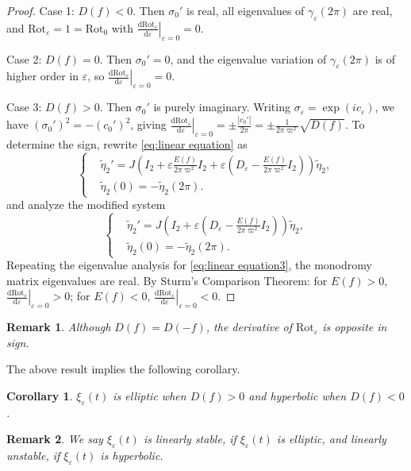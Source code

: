 \documentclass[11pt]{amsart}
\newcommand{\ep}{\varepsilon}
\newcommand{\om}{\varpi}
\newtheorem{remark}{Remark}[section]
\newtheorem{coro}{Corollary}[section]
\begin{document}
\begin{proof}
	Case 1: $D(f)<0$. Then $\sigma_{0}'$ is real, all eigenvalues of $\gamma_{\ep}(2\pi)$ are real, and $\text{Rot}_{\ep}=1=\text{Rot}_{0}$  with $\left.\frac{\mathrm{d}\text{Rot}_{\ep}}{\mathrm{d}\ep}\right|_{\ep=0}=0$.
	
	Case 2: $D(f)=0$. Then $\sigma_{0}'=0$, and the eigenvalue variation of $\gamma_{\ep}(2\pi)$ is of higher order in $\ep$, so $\left.\frac{\mathrm{d}\text{Rot}_{\ep}}{\mathrm{d}\ep}\right|_{\ep=0}=0$.
	
	Case 3: $D(f)>0$. Then $\sigma_{0}'$ is purely imaginary. Writing $\sigma_{\ep}=\exp(ic_{\ep})$, we have $(\sigma_{0}')^{2}=-(c_{0}')^{2}$, giving $\left.\frac{\mathrm{d}\text{Rot}_{\ep}}{\mathrm{d}\ep}\right|_{\ep=0}=\pm\frac{|c_{0}'|}{2\pi}=\pm\frac{1}{2\pi\om^{2}}\sqrt{D(f)}$. To determine the sign, rewrite \eqref{eq:linear equation} as 
	\begin{equation}\label{eq:linear equation2}
		\left\{\begin{aligned}
			&\tilde{\eta}_2'=J\left(I_2+\ep\frac{E(f)}{2\pi\om^{2}}I_2+\ep \left(D_{\ep}-\frac{E(f)}{2\pi\om^{2}}I_2\right)\right)\tilde{\eta}_2,\\
			&\tilde{\eta}_2(0)=-\tilde{\eta}_2(2\pi).
		\end{aligned}\right.
	\end{equation}
	and analyze the modified system 
	\begin{equation}\label{eq:linear equation3}
		\left\{\begin{aligned}
			&\tilde{\eta}_2'=J\left(I_2+\ep \left(D_{\ep}-\frac{E(f)}{2\pi\om^{2}}I_2\right)\right)\tilde{\eta}_2,\\
			&\tilde{\eta}_2(0)=-\tilde{\eta}_2(2\pi).
		\end{aligned}\right.
	\end{equation}
	Repeating the eigenvalue analysis for \eqref{eq:linear equation3}, the monodromy matrix eigenvalues are real. By Sturm’s Comparison Theorem: for $E(f)>0$, $\left.\frac{\mathrm{d}\text{Rot}_{\ep}}{\mathrm{d}\ep}\right|_{\ep=0}>0$; for $E(f)<0$, $\left.\frac{\mathrm{d}\text{Rot}_{\ep}}{\mathrm{d}\ep}\right|_{\ep=0}<0$.
\end{proof}
\begin{remark}
	Although $D(f)=D(-f)$, the derivative of $\text{Rot}_\ep$ is opposite in sign.
\end{remark}
The above result implies the following corollary. 

\begin{coro}\label{coro:linear stable}
	$\xi_{\ep}(t)$ is elliptic when $D(f)>0$ and hyperbolic when $D(f)<0$.
\end{coro}
\begin{remark}
	We say $\xi_{\ep}(t)$ is linearly stable, if $\xi_{\ep}(t)$ is elliptic, and linearly unstable, if $\xi_{\ep}(t)$ is hyperbolic.
\end{remark}
\end{document}
